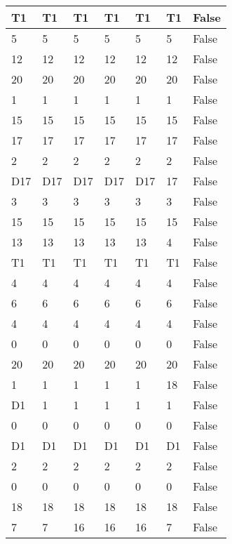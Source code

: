 \begin{longtable}[htbp]{| p{} | p{} | p{}| p{}| p{}| p{}| p{}|}
\multicolumn{1}{|l|}{T1} & \multicolumn{1}{l|}{T1} & \multicolumn{1}{l|}{T1} & \multicolumn{1}{l|}{T1} & \multicolumn{1}{l|}{T1} & \multicolumn{1}{l|}{T1} & False \\ \hline
5 & 5 & 5 & 5 & 5 & 5 & False \\ \hline
12 & 12 & 12 & 12 & 12 & 12 & False \\ \hline
20 & 20 & 20 & 20 & 20 & 20 & False \\ \hline
1 & 1 & 1 & 1 & 1 & 1 & False \\ \hline
15 & 15 & 15 & 15 & 15 & 15 & False \\ \hline
17 & 17 & 17 & 17 & 17 & 17 & False \\ \hline
2 & 2 & 2 & 2 & 2 & 2 & False \\ \hline
\multicolumn{1}{|l|}{D17} & \multicolumn{1}{l|}{D17} & \multicolumn{1}{l|}{D17} & \multicolumn{1}{l|}{D17} & \multicolumn{1}{l|}{D17} & 17 & False \\ \hline
3 & 3 & 3 & 3 & 3 & 3 & False \\ \hline
15 & 15 & 15 & 15 & 15 & 15 & False \\ \hline
13 & 13 & 13 & 13 & 13 & 4 & False \\ \hline
\multicolumn{1}{|l|}{T1} & \multicolumn{1}{l|}{T1} & \multicolumn{1}{l|}{T1} & \multicolumn{1}{l|}{T1} & \multicolumn{1}{l|}{T1} & \multicolumn{1}{l|}{T1} & False \\ \hline
4 & 4 & 4 & 4 & 4 & 4 & False \\ \hline
6 & 6 & 6 & 6 & 6 & 6 & False \\ \hline
4 & 4 & 4 & 4 & 4 & 4 & False \\ \hline
0 & 0 & 0 & 0 & 0 & 0 & False \\ \hline
20 & 20 & 20 & 20 & 20 & 20 & False \\ \hline
1 & 1 & 1 & 1 & 1 & 18 & False \\ \hline
\multicolumn{1}{|l|}{D1} & 1 & 1 & 1 & 1 & 1 & False \\ \hline
0 & 0 & 0 & 0 & 0 & 0 & False \\ \hline
\multicolumn{1}{|l|}{D1} & \multicolumn{1}{l|}{D1} & \multicolumn{1}{l|}{D1} & \multicolumn{1}{l|}{D1} & \multicolumn{1}{l|}{D1} & \multicolumn{1}{l|}{D1} & False \\ \hline
2 & 2 & 2 & 2 & 2 & 2 & False \\ \hline
0 & 0 & 0 & 0 & 0 & 0 & False \\ \hline
18 & 18 & 18 & 18 & 18 & 18 & False \\ \hline
7 & 7 & 16 & 16 & 16 & 7 & False \\ \hline

\end{longtable}
